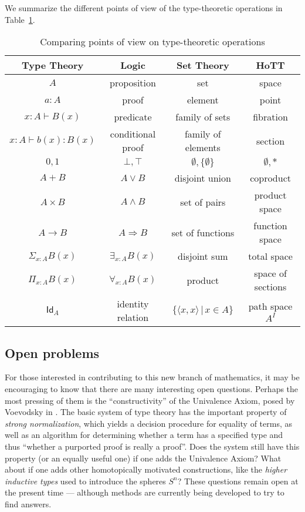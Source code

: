 {We summarize the different points of view of the type-theoretic operations in Table~\ref{tab:pov}.

\begin{table}\centering
  \begin{tabular}{c|c|c|c}
  	Type Theory & Logic & Set Theory & HoTT\\\hline
  	$A$ & proposition & set & space\\
	$a:A$ & proof & element & point \\
    	$x:A \vdash B(x)$ & predicate & family of sets & fibration \\
    	$x:A \vdash b(x) : B(x)$ & conditional proof & family of elements & section\\
	$0, 1$ & $\bot, \top$ & $\emptyset, \{ \emptyset \}$ & $\emptyset, *$\\
	$A + B$ & $A\vee B$ & disjoint union & coproduct\\
	$A\times B$ & $A\wedge B$ & set of pairs & product space\\
	$A\to B$ & $A\Rightarrow B$ & set of functions & function space\\
	$\Sigma_{x:A}B(x)$ &  $\exists_{x:A}B(x)$ & disjoint sum & total space\\
	$\Pi_{x:A}B(x)$ &  $\forall_{x:A}B(x)$ & product & space of sections\\
	$\mathsf{Id}_{A}$ & identity relation & $\{\langle x,x\rangle\, |\, x\in A\}$ & path space $A^I$
  \end{tabular}
  \caption{Comparing points of view on type-theoretic operations}\label{tab:pov}
\end{table}


\subsection*{Open problems} 

For those interested in contributing to this new branch of mathematics, it may be encouraging to know that there are many interesting open questions.  Perhaps the most pressing of them is the ``constructivity'' of the Univalence Axiom, posed by Voevodsky in \cite{Vo2012}.  The basic system of type theory has the important property of \emph{strong normalization}, which yields a decision procedure for equality of terms, as well as an algorithm for determining whether a term has a specified type and thus ``whether a purported proof is really a proof''.  Does the system still have this property (or an equally useful one) if one adds the Univalence Axiom?  What about if one adds other homotopically motivated constructions, like the \emph{higher inductive types} used to introduce the spheres $S^n$?  These questions remain open at the present time --- although methods are currently being developed to try to find answers.

}

